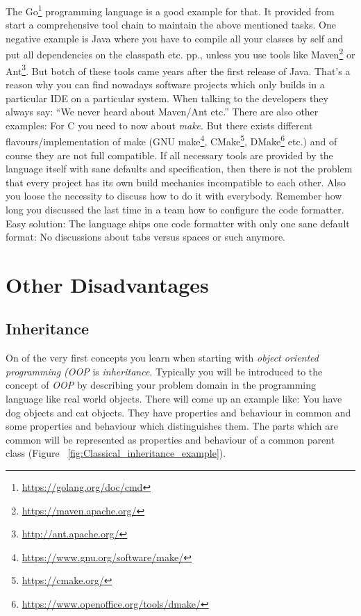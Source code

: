 \documentclass[11pt, a4paper]{report}
\begin{document}
The Go\footnote{\url{https://golang.org/doc/cmd}} programming language is a good example for that. It provided from start a comprehensive tool chain to maintain the above mentioned tasks. One negative example is Java where you have to compile all your classes by self and put all dependencies on the classpath etc. pp., unless you use tools like Maven\footnote{\url{https://maven.apache.org/}} or Ant\footnote{\url{http://ant.apache.org/}}. But botch of these tools came years after the first release of Java. That's a reason why you can find nowadays software projects which only builds in a particular IDE on a particular system. When talking to the developers they always say: ``We never heard about Maven/Ant etc.'' There are also other examples: For C you need to now about \textit{make}. But there exists different flavours/implementation of make (GNU make\footnote{\url{https://www.gnu.org/software/make/}}, CMake\footnote{\url{https://cmake.org/}}, DMake\footnote{\url{https://www.openoffice.org/tools/dmake/}} etc.) and of course they are not full compatible. If all necessary tools are provided by the language itself with sane defaults and specification, then there is not the problem that every project has its own build mechanics incompatible to each other. Also you loose the necessity to discuss how to do it with everybody. Remember how long you discussed the last time in a team how to configure the code formatter. Easy solution: The language ships one code formatter with only one sane default format: No discussions about tabs versus spaces or such anymore.

\section{Other Disadvantages}

\subsection{Inheritance}

On of the very first concepts you learn when starting with \textit{object oriented programming (OOP} is \textit{inheritance}. Typically you will be introduced to the concept of \textit{OOP} by describing your problem domain in the programming language like real world objects. There will come up an example like: You have dog objects and cat objects. They have properties and behaviour in common and some properties and behaviour which distinguishes them. The parts which are common will be represented as properties and behaviour of a common parent class (Figure ~\ref{fig:Classical_inheritance_example}).
\end{document}
